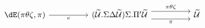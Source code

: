 \[\begin{tikzcd}
	{\dE(\pi\theta\zeta,\pi)} && {(\Tm.\Sigma\Delta\Tm)\Sigma.\Pi'\Tm} && \Tm
	\arrow["\pi\theta\zeta", shift left=2, from=1-3, to=1-5]
	\arrow["\pi"', shift right=2, from=1-3, to=1-5]
	\arrow["e"', from=1-1, to=1-3]
\end{tikzcd}\]